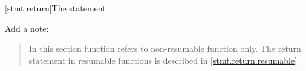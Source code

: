 \setcounter{subsection}{2}
[stmt.return]{The  statement}%
%
%

Add a note:

\begin{quote}
\enternote
In this section function refers to non-resumable function only.
The return statement in resumable functions is described in \ref{stmt.return.resumable}
\exitnote
\end{quote}

%
%
%
